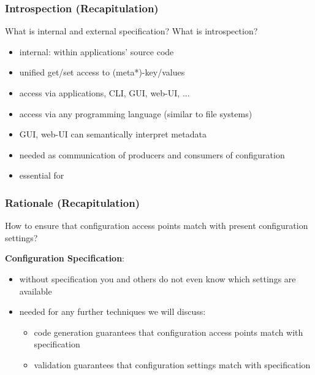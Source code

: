 \begin{frame}
	\frametitle{Introspection (Recapitulation)}
	\begin{task}
	What is internal and external specification?
	What is introspection?
	\end{task}

	\pause
	\vspace{1em}

	\begin{itemize}
	\item internal: within applications' source code
	\item unified get/set access to (meta*)-key/values
	\item access via applications, CLI, GUI, web-UI, ...
	\item access via any programming language (similar to file systems)
	\item GUI, web-UI can semantically interpret metadata
	\item needed as communication of producers and consumers of configuration
	\item essential for ~\citet{holland2001nofutz}
	\end{itemize}
\end{frame}

\begin{frame}
	\frametitle{Rationale (Recapitulation)}
	\begin{task}
	How to ensure that configuration access points match with present configuration settings?
	\end{task}

	\pause
	\vspace{1em}

	\textbf{Configuration Specification}:
	\begin{itemize}
	\item without specification you and others do not even know which settings are available
	\item needed for any further techniques we will discuss:
		\begin{itemize}
		\item code generation guarantees that configuration access points match with specification
		\item validation guarantees that configuration settings match with specification
		\end{itemize}
	\end{itemize}
\end{frame}

